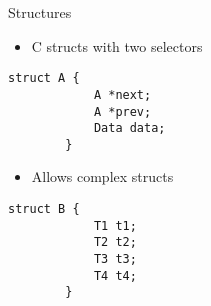 \begin{frame}[fragile]{Structures}
    \begin{itemize}
        \pause
        \item <2-> C structs with two selectors
        \pause
    \end{itemize}
    
    \begin{lstlisting}[style=customc]
        struct A {
            A *next;
            A *prev;
            Data data;
        }    
    \end{lstlisting}

    \begin{itemize}
        \pause
        \item <4-> Allows complex structs
        \pause
    \end{itemize}

    \begin{lstlisting}[style=customc]
        struct B {
            T1 t1;
            T2 t2;
            T3 t3;
            T4 t4;
        }    
    \end{lstlisting}

\end{frame}

